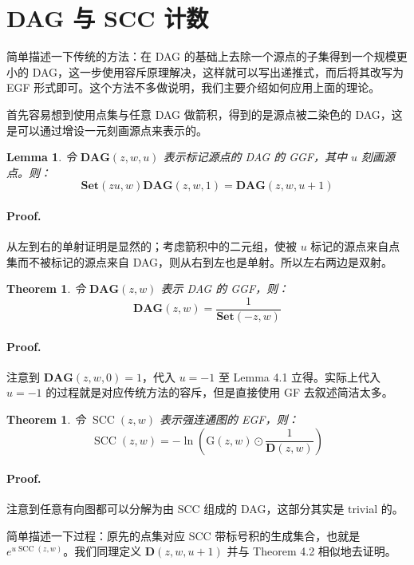 \documentclass[10pt,a4paper,oneside]{article}
\newtheorem{theorem}[definition]{Theorem}
\newtheorem{lemma}[definition]{Lemma}
\begin{document}
\section{DAG 与 SCC 计数}

简单描述一下传统的方法：在 DAG 的基础上去除一个源点的子集得到一个规模更小的 DAG，这一步使用容斥原理解决，这样就可以写出递推式，而后将其改写为 EGF 形式即可。这个方法不多做说明，我们主要介绍如何应用上面的理论。

首先容易想到使用点集与任意 DAG 做箭积，得到的是源点被二染色的 DAG，这是可以通过增设一元刻画源点来表示的。

\begin{lemma}
    令 $\mathbf{DAG}(z,w,u)$ 表示标记源点的 DAG 的 GGF，其中 $u$ 刻画源点。则：
    \[\mathbf{Set}(zu,w)\mathbf{DAG}(z,w,1) = \mathbf{DAG}(z,w,u+1)\]
\end{lemma}

\paragraph{Proof.} 从左到右的单射证明是显然的；考虑箭积中的二元组，使被 $u$ 标记的源点来自点集而不被标记的源点来自 DAG，则从右到左也是单射。所以左右两边是双射。

\begin{theorem}
    令 $\mathbf{DAG}(z,w)$ 表示 DAG 的 GGF，则：
    \[\mathbf{DAG}(z,w) = \dfrac 1{\mathbf{Set}(-z,w)}\]
\end{theorem}

\paragraph{Proof.} 注意到 $\mathbf{DAG}(z,w,0) = 1$，代入 $u=-1$ 至 Lemma 4.1 立得。实际上代入 $u=-1$ 的过程就是对应传统方法的容斥，但是直接使用 GF 去叙述简洁太多。

\begin{theorem}
    令 $\operatorname{SCC}(z,w)$ 表示强连通图的 EGF，则：
    \[\operatorname{SCC}(z,w) = -\ln\left(\mathrm G(z,w) \odot \dfrac{1}{\mathbf D(z,w)}\right)\]
\end{theorem}

\paragraph{Proof.} 注意到任意有向图都可以分解为由 SCC 组成的 DAG，这部分其实是 trivial 的。

简单描述一下过程：原先的点集对应 SCC 带标号积的生成集合，也就是 $e^{u \operatorname{SCC}(z,w)}$。我们同理定义 $\mathbf{D}(z,w,u+1)$ 并与 Theorem 4.2 相似地去证明。
\end{document}
